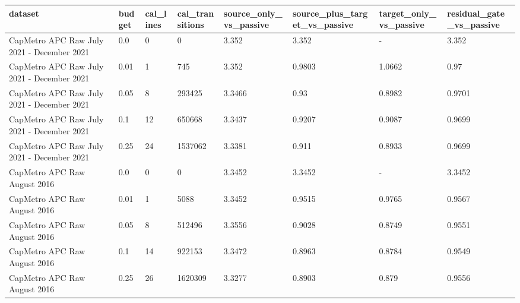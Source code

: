 \begin{tabular}{llllllll}
\toprule
dataset & budget & cal\_lines & cal\_transitions & source\_only\_vs\_passive & source\_plus\_target\_vs\_passive & target\_only\_vs\_passive & residual\_gate\_vs\_passive \\
\midrule
CapMetro APC Raw July 2021 - December 2021 & 0.0 & 0 & 0 & 3.352 & 3.352 & - & 3.352 \\
CapMetro APC Raw July 2021 - December 2021 & 0.01 & 1 & 745 & 3.352 & 0.9803 & 1.0662 & 0.97 \\
CapMetro APC Raw July 2021 - December 2021 & 0.05 & 8 & 293425 & 3.3466 & 0.93 & 0.8982 & 0.9701 \\
CapMetro APC Raw July 2021 - December 2021 & 0.1 & 12 & 650668 & 3.3437 & 0.9207 & 0.9087 & 0.9699 \\
CapMetro APC Raw July 2021 - December 2021 & 0.25 & 24 & 1537062 & 3.3381 & 0.911 & 0.8933 & 0.9699 \\
CapMetro APC Raw August 2016 & 0.0 & 0 & 0 & 3.3452 & 3.3452 & - & 3.3452 \\
CapMetro APC Raw August 2016 & 0.01 & 1 & 5088 & 3.3452 & 0.9515 & 0.9765 & 0.9567 \\
CapMetro APC Raw August 2016 & 0.05 & 8 & 512496 & 3.3556 & 0.9028 & 0.8749 & 0.9551 \\
CapMetro APC Raw August 2016 & 0.1 & 14 & 922153 & 3.3472 & 0.8963 & 0.8784 & 0.9549 \\
CapMetro APC Raw August 2016 & 0.25 & 26 & 1620309 & 3.3277 & 0.8903 & 0.879 & 0.9556 \\
\bottomrule
\end{tabular}
